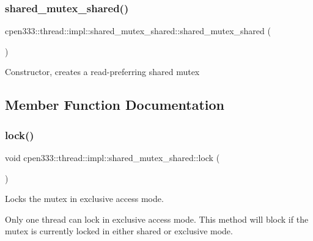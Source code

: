\subsubsection{\texorpdfstring{shared\+\_\+mutex\+\_\+shared()}{shared\_mutex\_shared()}}
{\footnotesize\ttfamily cpen333\+::thread\+::impl\+::shared\+\_\+mutex\+\_\+shared\+::shared\+\_\+mutex\+\_\+shared (\begin{DoxyParamCaption}{ }\end{DoxyParamCaption})\hspace{0.3cm}{\ttfamily [inline]}}

Constructor, creates a read-\/preferring shared mutex 

\subsection{Member Function Documentation}
\mbox{\label{classcpen333_1_1thread_1_1impl_1_1shared__mutex__shared_ab38a0ee8010e85192efb9544aa460310}} 
\subsubsection{\texorpdfstring{lock()}{lock()}}
{\footnotesize\ttfamily void cpen333\+::thread\+::impl\+::shared\+\_\+mutex\+\_\+shared\+::lock (\begin{DoxyParamCaption}{ }\end{DoxyParamCaption})\hspace{0.3cm}{\ttfamily [inline]}}



Locks the mutex in exclusive access mode. 

Only one thread can lock in exclusive access mode. This method will block if the mutex is currently locked in either shared or exclusive mode. \mbox{\label{classcpen333_1_1thread_1_1impl_1_1shared__mutex__shared_a16b3ba22ee6190696e7c333379e786d3}} 
